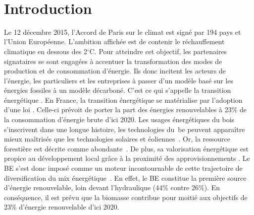 \documentclass[12pt]{report}
\begin{document}
\newpage
\thispagestyle{empty}
~
\newpage

\chapter{Introduction}

Le 12 décembre 2015, l'Accord de Paris sur le climat est signé par 194 pays et
l'Union Européenne. L'ambition affichée est de contenir le réchauffement
climatique en dessous des 2$^{\circ}$C. Pour atteindre cet objectif, les partenaires signataires
se sont engagées à accentuer la transformation des modes de production et de
consommation d'énergie. Ils donc incitent les acteurs de l'énergie, les particuliers
et les entreprises à passer d'un modèle basé sur les énergies fossiles à un
modèle décarboné. C'est ce qui s'appelle la transition énergétique
\citep{kern2008_ref112,rojey2008_ref118}. En France, la transition
énergétique se matérialise par l'adoption d'une loi . Celle-ci prévoit de porter la part des
énergies renouvelables à 23\% de la consommation d'énergie brute d'ici 2020. Les
usages énergétiques du bois s'inscrivent dans une longue histoire, les
technologies du~\gls{be} peuvent apparaître mieux maîtrisés que les
technologies solaires et éoliennes~\citep{bontoux2009_ref119}. Or, la ressource forestière est
décrite comme abondante~\citep{ifn2005_ref120}. De plus, sa valorisation énergétique est
propice au développement local grâce à la proximité des approvisionnements
\citep{poinsot2012_ref122,tritz2012_ref123}. Le BE s'est donc imposé comme un
moteur incontournable de cette trajectoire de
diversification du mix énergétique~\citep{ademeMixEn_ref108}. En effet, le BE
constitue la première source d'énergie renouvelable, loin devant l'hydraulique
(44\% contre 26\%). En conséquence, il est prévu que la biomasse contribue pour
moitié aux objectifs de 23\% d'énergie renouvelable d'ici 2020.\\
\end{document}
